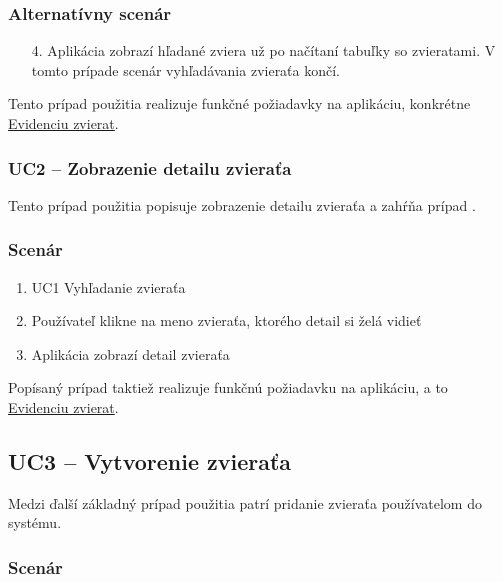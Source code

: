\subsubsection*{Alternatívny scenár}

\begin{enumerate}
    \item [4.] Aplikácia zobrazí hľadané zviera už po načítaní tabuľky so zvieratami. V tomto prípade scenár vyhľadávania zvieraťa končí.
\end{enumerate}

Tento prípad použitia realizuje funkčné požiadavky na aplikáciu, konkrétne \hyperref[evidencia-zvierat]{Evidenciu zvierat}.

\subsubsection*{UC2 -- Zobrazenie detailu zvieraťa}\label{uc2}

Tento prípad použitia popisuje zobrazenie detailu zvieraťa a zahŕňa prípad .

\subsubsection*{Scenár}

\begin{enumerate}
	\item UC1 Vyhľadanie zvieraťa
	\item Používateľ klikne na meno zvieraťa, ktorého detail si želá vidieť
	\item Aplikácia zobrazí detail zvieraťa
\end{enumerate}

Popísaný prípad taktiež realizuje funkčnú požiadavku na aplikáciu, a to \hyperref[evidencia-zvierat]{Evidenciu zvierat}.

\subsection*{UC3 -- Vytvorenie zvieraťa}

Medzi ďalší základný prípad použitia patrí pridanie zvieraťa používatelom do systému.

\subsubsection*{Scenár}

